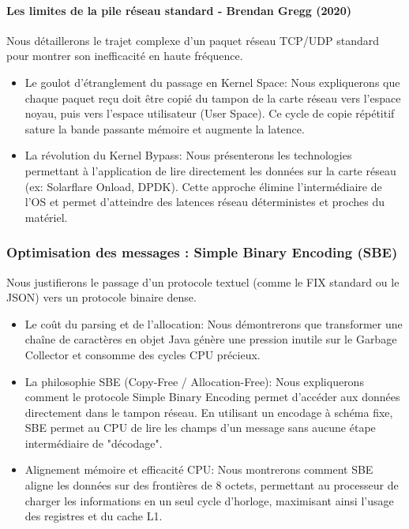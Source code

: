 \paragraph{Les limites de la pile réseau standard - Brendan Gregg (2020)}

Nous détaillerons le trajet complexe d'un paquet réseau TCP/UDP standard pour montrer son inefficacité en haute fréquence. 

\begin{itemize}
    \item Le goulot d'étranglement du passage en Kernel Space: Nous expliquerons que chaque paquet reçu doit être copié du tampon de la carte réseau vers l'espace noyau, puis vers l'espace utilisateur (User Space). Ce cycle de copie répétitif sature la bande passante mémoire et augmente la latence.
    \item La révolution du Kernel Bypass: Nous présenterons les technologies permettant à l'application de lire directement les données sur la carte réseau (ex: Solarflare Onload, DPDK). Cette approche élimine l'intermédiaire de l'OS et permet d'atteindre des latences réseau déterministes et proches du matériel.
\end{itemize}

\subsubsection{Optimisation des messages : Simple Binary Encoding (SBE)}

Nous justifierons le passage d'un protocole textuel (comme le FIX standard ou le JSON) vers un protocole binaire dense.

\begin{itemize}
    \item Le coût du parsing et de l'allocation: Nous démontrerons que transformer une chaîne de caractères en objet Java génère une pression inutile sur le Garbage Collector et consomme des cycles CPU précieux.
    \item La philosophie SBE (Copy-Free / Allocation-Free): Nous expliquerons comment le protocole Simple Binary Encoding permet d'accéder aux données directement dans le tampon réseau. En utilisant un encodage à schéma fixe, SBE permet au CPU de lire les champs d'un message sans aucune étape intermédiaire de "décodage".
    \item Alignement mémoire et efficacité CPU: Nous montrerons comment SBE aligne les données sur des frontières de 8 octets, permettant au processeur de charger les informations en un seul cycle d'horloge, maximisant ainsi l'usage des registres et du cache L1.
\end{itemize}